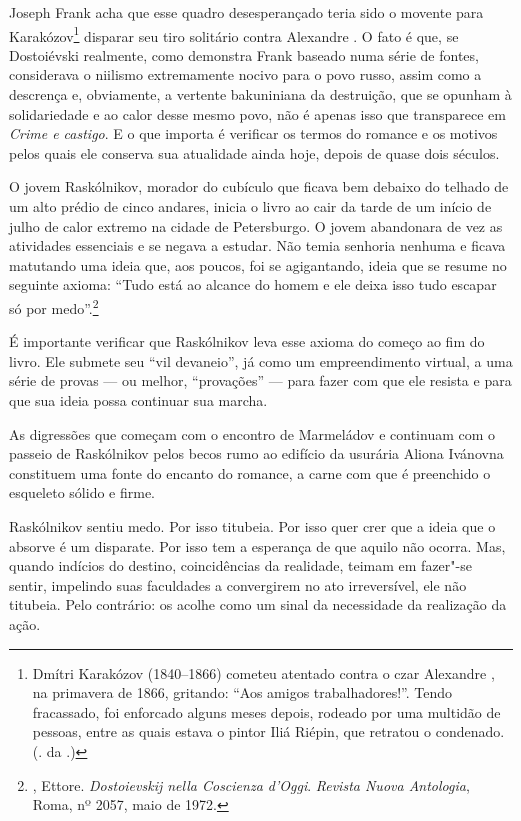 Joseph Frank acha que esse quadro desesperançado teria sido o movente
para Karakózov\footnote{Dmítri Karakózov (1840--1866) cometeu atentado
  contra o czar Alexandre , na primavera de 1866, gritando: ``Aos amigos
  trabalhadores!''. Tendo fracassado, foi enforcado alguns meses depois,
  rodeado por uma multidão de pessoas, entre as quais estava o pintor
  Iliá Riépin, que retratou o condenado. (. da .)} disparar seu tiro
solitário contra Alexandre . O fato é que, se Dostoiévski realmente, como demonstra Frank baseado numa série de fontes, considerava o
niilismo extremamente nocivo para o povo russo, assim como a descrença
e, obviamente, a vertente bakuniniana da destruição, que se opunham à
solidariedade e ao calor desse mesmo povo, não é apenas isso que transparece em
\emph{Crime e castigo}. E o que importa é verificar os termos do romance
e os motivos pelos quais ele conserva sua atualidade ainda hoje, depois
de quase dois séculos.

O jovem Raskólnikov, morador do cubículo que ficava bem debaixo do
telhado de um alto prédio de cinco andares, inicia o livro ao cair da
tarde de um início de julho de calor extremo na cidade de Petersburgo. O
jovem abandonara de vez as atividades essenciais e se negava a estudar.
Não temia senhoria nenhuma e ficava matutando uma ideia que, aos poucos,
foi se agigantando, ideia que se resume no seguinte axioma: ``Tudo está
ao alcance do homem e ele deixa isso tudo escapar só por
medo''.\footnote{, Ettore. \emph{Dostoievskij nella Coscienza
  d'Oggi}. \emph{Revista Nuova Antologia}, Roma, nº 2057, maio de 1972.}

É importante verificar que Raskólnikov leva esse axioma do começo ao fim
do livro. Ele submete seu ``vil devaneio'', já como um empreendimento
virtual, a uma série de provas --- ou melhor, ``provações'' --- para fazer
com que ele resista e para que sua ideia possa continuar sua marcha.

As digressões que começam com o encontro de Marmeládov e continuam com o
passeio de Raskólnikov pelos becos rumo ao edifício da usurária Aliona
Ivánovna constituem uma fonte do encanto do romance, a carne com que é
preenchido o esqueleto sólido e firme.

Raskólnikov sentiu medo. Por isso titubeia. Por isso quer crer que a
ideia que o absorve é um disparate. Por isso tem a esperança de que
aquilo não ocorra. Mas, quando indícios do destino, coincidências da
realidade, teimam em fazer"-se sentir, impelindo suas faculdades a
convergirem no ato irreversível, ele não titubeia. Pelo contrário: os
acolhe como um sinal da necessidade da realização da ação.

